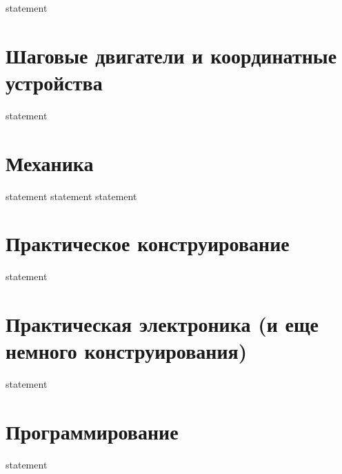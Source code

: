 {statement}

\section{Шаговые двигатели и координатные устройства}

{statement}
\section{Механика}

{statement}
{statement}
{statement}

\section{Практическое конструирование}

{statement}

\section{Практическая электроника (и еще немного конструирования)}

{statement}

\section{Программирование}

{statement}
